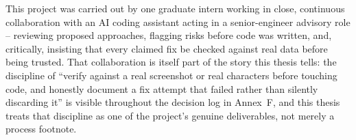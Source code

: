 This project was carried out by one graduate intern working in close, continuous collaboration with an AI coding assistant acting in a senior-engineer advisory role -- reviewing proposed approaches, flagging risks before code was written, and, critically, insisting that every claimed fix be checked against real data before being trusted. That collaboration is itself part of the story this thesis tells: the discipline of ``verify against a real screenshot or real characters before touching code, and honestly document a fix attempt that failed rather than silently discarding it'' is visible throughout the decision log in Annex~F, and this thesis treats that discipline as one of the project's genuine deliverables, not merely a process footnote.
